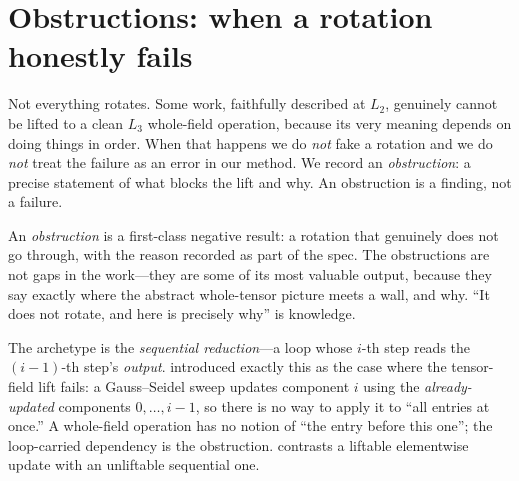 \section{Obstructions: when a rotation honestly fails}
\label{sec:obstruction}

Not everything rotates. Some work, faithfully described at $L_2$, genuinely cannot
be lifted to a clean $L_3$ whole-field operation, because its very meaning depends
on doing things in order. When that happens we do \emph{not} fake a rotation and
we do \emph{not} treat the failure as an error in our method. We record an
\emph{obstruction}: a precise statement of what blocks the lift and why. An
obstruction is a finding, not a failure.

\begin{keyidea}
An \emph{obstruction} is a first-class negative result: a rotation that genuinely
does not go through, with the reason recorded as part of the spec. The obstructions
are not gaps in the work---they are some of its most valuable output, because they
say exactly where the abstract whole-tensor picture meets a wall, and why. ``It
does not rotate, and here is precisely why'' is knowledge.
\end{keyidea}

The archetype is the \emph{sequential reduction}---a loop whose $i$-th step reads
the $(i-1)$-th step's \emph{output}.  introduced exactly this as
the case where the tensor-field lift fails: a Gauss--Seidel sweep updates
component $i$ using the \emph{already-updated} components $0,\dots,i-1$, so there
is no way to apply it to ``all entries at once.'' A whole-field operation has no
notion of ``the entry before this one''; the loop-carried dependency is the
obstruction.  contrasts a liftable elementwise update with
an unliftable sequential one.

